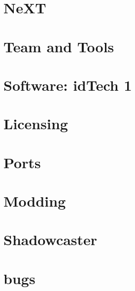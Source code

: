 \documentclass{book}
\begin{document}
     \chapter{NeXT}
          


    

    \chapter{Team and Tools}
          
      
      
      





    \chapter{Software: idTech 1}
      
      
      
      
      
      
      
      
      
      
      
      
      
      

    \chapter{Licensing}
      
      
      

    \chapter{Ports}        
          

    \chapter{Modding}
      

    \appendix
    \appendixpage
      \chapter{Shadowcaster}  
      
      \chapter{bugs}
      
\end{document}
